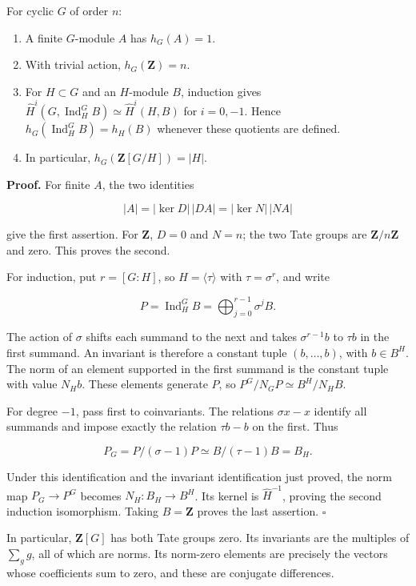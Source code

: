 \documentclass[11pt,a4paper]{article}
\newcommand{\tightlist}{\setlength{\itemsep}{0pt}\setlength{\parskip}{0pt}}
\begin{document}
For cyclic \(G\) of order \(n\):

\begin{enumerate}
\def\labelenumi{\arabic{enumi}.}
\tightlist
\item
  A finite \(G\)-module \(A\) has \(h_G(A)=1\).
\item
  With trivial action, \(h_G(\mathbf Z)=n\).
\item
  For \(H\subset G\) and an \(H\)-module \(B\), induction gives
  \(\widehat H^i(G,\operatorname{Ind}_H^G B)\simeq\widehat H^i(H,B)\)
  for \(i=0,-1\). Hence \(h_G(\operatorname{Ind}_H^G B)=h_H(B)\)
  whenever these quotients are defined.
\item
  In particular, \(h_G(\mathbf Z[G/H])=|H|\).
\end{enumerate}

\textbf{Proof.} For finite \(A\), the two identities

\[
|A|=|\ker D|\,|DA|=|\ker N|\,|NA|
\]

give the first assertion. For \(\mathbf Z\), \(D=0\) and \(N=n\); the
two Tate groups are \(\mathbf Z/n\mathbf Z\) and zero. This proves the
second.

For induction, put \(r=[G:H]\), so \(H=\langle\tau\rangle\) with
\(\tau=\sigma^r\), and write

\[
P=\operatorname{Ind}_H^G B=
\bigoplus_{j=0}^{r-1}\sigma^j B.
\]

The action of \(\sigma\) shifts each summand to the next and takes
\(\sigma^{r-1}b\) to \(\tau b\) in the first summand. An invariant is
therefore a constant tuple \((b,\ldots,b)\), with \(b\in B^H\). The norm
of an element supported in the first summand is the constant tuple with
value \(N_Hb\). These elements generate \(P\), so
\(P^G/N_GP\simeq B^H/N_HB\).

For degree \(-1\), pass first to coinvariants. The relations
\(\sigma x-x\) identify all summands and impose exactly the relation
\(\tau b-b\) on the first. Thus

\[
P_G=P/(\sigma-1)P\simeq B/(\tau-1)B=B_H.
\]

Under this identification and the invariant identification just proved,
the norm map \(P_G\to P^G\) becomes \(N_H:B_H\to B^H\). Its kernel is
\(\widehat H^{-1}\), proving the second induction isomorphism. Taking
\(B=\mathbf Z\) proves the last assertion. \(\square\)

In particular, \(\mathbf Z[G]\) has both Tate groups zero. Its
invariants are the multiples of \(\sum_g g\), all of which are norms.
Its norm-zero elements are precisely the vectors whose coefficients sum
to zero, and these are conjugate differences.
\end{document}
